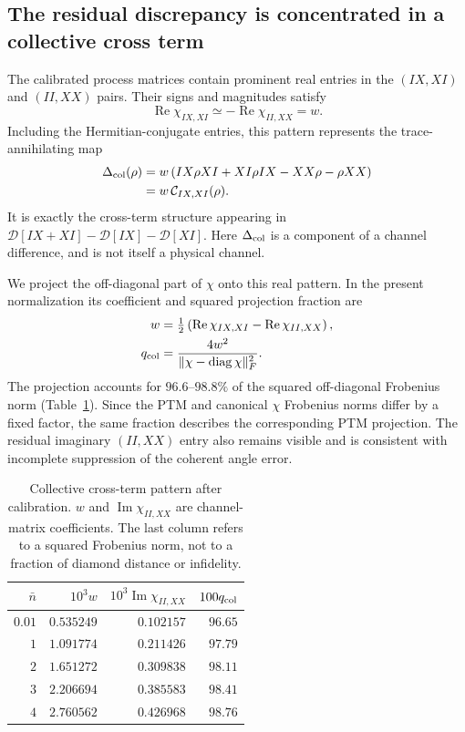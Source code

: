 \documentclass[a4paper,11pt]{article}
\newcommand{\Diss}{\mathcal D}
\begin{document}
\subsection{The residual discrepancy is concentrated in a collective cross term}
\label{subsec:dominant_component}

The calibrated process matrices contain prominent real entries in
the $(IX,XI)$ and $(II,XX)$ pairs. Their signs and magnitudes satisfy
\begin{equation}
 \operatorname{Re}\chi_{IX,XI}\simeq
 -\operatorname{Re}\chi_{II,XX}=w.
\end{equation}
Including the Hermitian-conjugate entries, this pattern represents
the trace-annihilating map
\begin{align}
 \Delta_{\rm col}(\rho)
 &=w\left(IX\rho XI+XI\rho IX-XX\rho-\rho XX\right)\nonumber\\
 &=w\,\mathcal C_{IX,XI}(\rho).
 \label{eq:channel_cross_pattern}
\end{align}
It is exactly the cross-term structure appearing in
$\Diss[IX+XI]-\Diss[IX]-\Diss[XI]$. Here $\Delta_{\rm col}$ is a
component of a channel difference, and is not itself a physical channel.

We project the off-diagonal part of $\chi$ onto this real pattern.
In the present normalization its coefficient and squared projection
fraction are
\begin{align}
 w&=\tfrac12\left(\operatorname{Re}\chi_{IX,XI}
                    -\operatorname{Re}\chi_{II,XX}\right),\\
 q_{\rm col}
 &=\frac{4w^2}{\|\chi-\operatorname{diag}\chi\|_F^2}.
 \label{eq:pattern_fraction}
\end{align}
The projection accounts for $96.6$--$98.8\%$ of the squared
off-diagonal Frobenius norm (Table~\ref{tab:pattern}). Since the PTM
and canonical $\chi$ Frobenius norms differ by a fixed factor, the
same fraction describes the corresponding PTM projection.
The residual imaginary $(II,XX)$ entry also remains visible and is
consistent with incomplete suppression of the coherent angle error.

\begin{table}[htbp]
\centering
\caption{Collective cross-term pattern after calibration. $w$ and
$\operatorname{Im}\chi_{II,XX}$ are channel-matrix coefficients.
The last column refers to a squared Frobenius norm, not to a fraction
of diamond distance or infidelity.}
\label{tab:pattern}
\begin{tabular}{rrrr}
\toprule
$\bar n$ & $10^3 w$ & $10^3\operatorname{Im}\chi_{II,XX}$ &
$100q_{\rm col}$\\
\midrule
$0.01$ & $0.535249$ & $0.102157$ & $96.65$\\
$1$ & $1.091774$ & $0.211426$ & $97.79$\\
$2$ & $1.651272$ & $0.309838$ & $98.11$\\
$3$ & $2.206694$ & $0.385583$ & $98.41$\\
$4$ & $2.760562$ & $0.426968$ & $98.76$\\
\bottomrule
\end{tabular}
\end{table}
\end{document}
